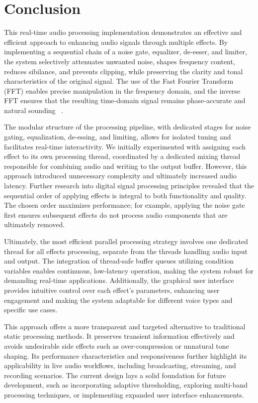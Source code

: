 \documentclass[conference]{IEEEtran}
\begin{document}
\section{Conclusion}

This real-time audio processing implementation demonstrates an effective and efficient approach to enhancing audio signals through multiple effects. By implementing a sequential chain of a noise gate, equalizer, de-esser, and limiter, the system selectively attenuates unwanted noise, shapes frequency content, reduces sibilance, and prevents clipping, while preserving the clarity and tonal characteristics of the original signal. The use of the Fast Fourier Transform (FFT) enables precise manipulation in the frequency domain, and the inverse FFT ensures that the resulting time-domain signal remains phase-accurate and natural sounding ~\cite{cooley1965}.

The modular structure of the processing pipeline, with dedicated stages for noise gating, equalization, de-essing, and limiting, allows for isolated tuning and facilitates real-time interactivity. We initially experimented with assigning each effect to its own processing thread, coordinated by a dedicated mixing thread responsible for combining audio and writing to the output buffer. However, this approach introduced unnecessary complexity and ultimately increased audio latency. Further research into digital signal processing principles revealed that the sequential order of applying effects is integral to both functionality and quality. The chosen order maximizes performance; for example, applying the noise gate first ensures subsequent effects do not process audio components that are ultimately removed.

Ultimately, the most efficient parallel processing strategy involves one dedicated thread for all effects processing, separate from the threads handling audio input and output. The integration of thread-safe buffer queues utilizing condition variables enables continuous, low-latency operation, making the system robust for demanding real-time applications. Additionally, the graphical user interface provides intuitive control over each effect's parameters, enhancing user engagement and making the system adaptable for different voice types and specific use cases.

This approach offers a more transparent and targeted alternative to traditional static processing methods. It preserves transient information effectively and avoids undesirable side effects such as over-compression or unnatural tone shaping. Its performance characteristics and responsiveness further highlight its applicability in live audio workflows, including broadcasting, streaming, and recording scenarios. The current design lays a solid foundation for future development, such as incorporating adaptive thresholding, exploring multi-band processing techniques, or implementing expanded user interface enhancements.
\end{document}
